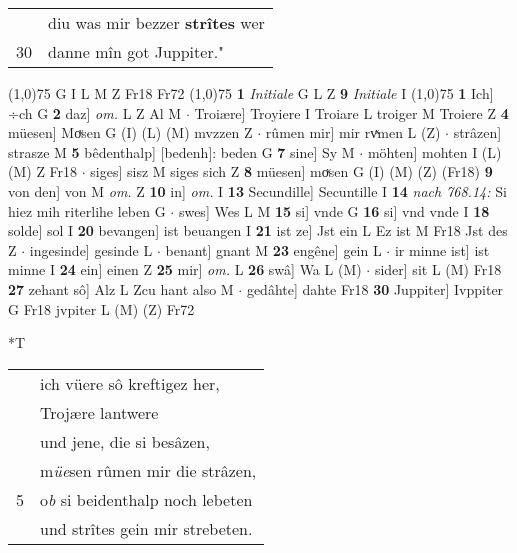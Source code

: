 \documentclass[8pt,a4paper,notitlepage]{article}
\begin{document}
\begin{table}[ht]
\begin{minipage}[t]{0.5\linewidth}
\begin{tabular}{rl}
 & diu was mir bezzer \textbf{strîtes} wer\\ 
30 & danne mîn got Juppiter."\\ 
\end{tabular}
\scriptsize
\line(1,0){75} \newline
G I L M Z Fr18 Fr72 \newline
\line(1,0){75} \newline
\textbf{1} \textit{Initiale} G L Z  \textbf{9} \textit{Initiale} I  \newline
\line(1,0){75} \newline
\textbf{1} Ich] ÷ch G \textbf{2} daz] \textit{om.} L Z Al M  $\cdot$ Troiære] Troyiere I Troiare L troiger M Troiere Z \textbf{4} müesen] Moͮsen G (I) (L) (M) mvzzen Z  $\cdot$ rûmen mir] mir rvͯmen L (Z)  $\cdot$ strâzen] strasze M \textbf{5} bêdenthalp] [bedenh]: beden G \textbf{7} sine] Sy M  $\cdot$ möhten] mohten I (L) (M) Z Fr18  $\cdot$ siges] sisz M siges sich Z \textbf{8} müesen] moͮsen G (I) (M) (Z) (Fr18) \textbf{9} von den] von M \textit{om.} Z \textbf{10} in] \textit{om.} I \textbf{13} Secundille] Secuntille I \textbf{14} \textit{nach 768.14:} Si hiez mih riterlihe leben G   $\cdot$ swes] Wes L M \textbf{15} si] vnde G \textbf{16} si] vnd vnde I \textbf{18} solde] sol I \textbf{20} bevangen] ist beuangen I \textbf{21} ist ze] Jst ein L Ez ist M Fr18 Jst des Z  $\cdot$ ingesinde] gesinde L  $\cdot$ benant] gnant M \textbf{23} engêne] gein L  $\cdot$ ir minne ist] ist minne I \textbf{24} ein] einen Z \textbf{25} mir] \textit{om.} L \textbf{26} swâ] Wa L (M)  $\cdot$ sider] sit L (M) Fr18 \textbf{27} zehant sô] Alz L Zcu hant also M  $\cdot$ gedâhte] dahte Fr18 \textbf{30} Juppiter] Ivppiter G Fr18 jvpiter L (M) (Z) Fr72 \newline
\end{minipage}
\hspace{0.5cm}
\begin{minipage}[t]{0.5\linewidth}
\small
\begin{center}*T
\end{center}
\begin{tabular}{rl}
 & ich vüere sô kreftigez her,\\ 
 & Trojære lantwere\\ 
 & und jene, die si besâzen,\\ 
 & m\textit{üe}sen rûmen mir die strâzen,\\ 
5 & o\textit{b} si beidenthalp noch lebeten\\ 
 & und strîtes gein mir strebeten.\\ 

\end{tabular}
\end{minipage}
\end{table}
\end{document}
